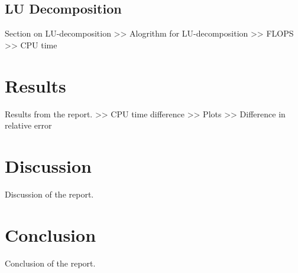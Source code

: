 \documentclass[10pt, a4paper]{amsart}
\begin{document}
\subsection{LU Decomposition}
Section on LU-decomposition
>> Alogrithm for LU-decomposition >> FLOPS >> CPU time

\section{Results}
Results from the report.
>> CPU time difference >> Plots >> Difference in relative error

\section{Discussion}
Discussion of the report.
\section{Conclusion}
Conclusion of the report.




\end{document}
